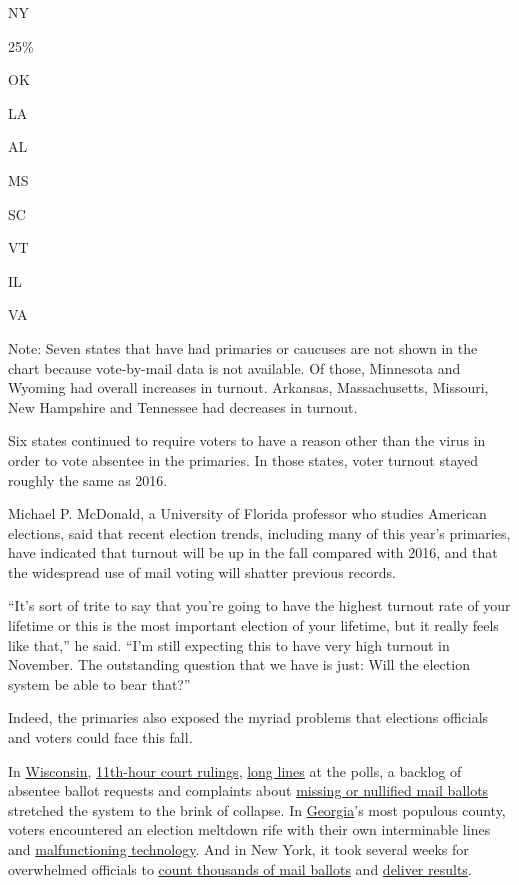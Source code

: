 NY

25\%

OK

LA

AL

MS

SC

VT

IL

VA

Note: Seven states that have had primaries or caucuses are not shown in
the chart because vote-by-mail data is not available. Of those,
Minnesota and Wyoming had overall increases in turnout. Arkansas,
Massachusetts, Missouri, New Hampshire and Tennessee had decreases in
turnout.

Six states continued to require voters to have a reason other than the
virus in order to vote absentee in the primaries. In those states, voter
turnout stayed roughly the same as 2016.

Michael P. McDonald, a University of Florida professor who studies
American elections, said that recent election trends, including many of
this year's primaries, have indicated that turnout will be up in the
fall compared with 2016, and that the widespread use of mail voting will
shatter previous records.

``It's sort of trite to say that you're going to have the highest
turnout rate of your lifetime or this is the most important election of
your lifetime, but it really feels like that,'' he said. ``I'm still
expecting this to have very high turnout in November. The outstanding
question that we have is just: Will the election system be able to bear
that?''

Indeed, the primaries also exposed the myriad problems that elections
officials and voters could face this fall.

In
\href{https://www.nytimes3xbfgragh.onion/2020/04/07/us/politics/wisconsin-election-coronavirus.html}{Wisconsin},
\href{https://www.nytimes3xbfgragh.onion/2020/04/07/us/politics/wisconsin-elections-supreme-court.html}{11th-hour
court rulings},
\href{https://www.nytimes3xbfgragh.onion/2020/04/07/us/politics/wisconsin-election-coronavirus.html}{long
lines} at the polls, a backlog of absentee ballot requests and
complaints about
\href{https://www.nytimes3xbfgragh.onion/2020/04/09/us/politics/wisconsin-election-absentee-coronavirus.html}{missing
or nullified mail ballots} stretched the system to the brink of
collapse. In
\href{https://www.nytimes3xbfgragh.onion/2020/07/25/us/politics/georgia-election-voting-problems.html}{Georgia}'s
most populous county, voters encountered an election meltdown rife with
their own interminable lines and
\href{https://www.nytimes3xbfgragh.onion/2020/06/11/us/politics/georgia-voting-machines.html}{malfunctioning
technology}. And in New York, it took several weeks for overwhelmed
officials to
\href{https://www.nytimes3xbfgragh.onion/2020/06/19/us/politics/nyc-vote-by-mail.html}{count
thousands of mail ballots} and
\href{https://www.nytimes3xbfgragh.onion/2020/08/04/nyregion/maloney-torres-ny-congressional-races.html}{deliver
results}.


